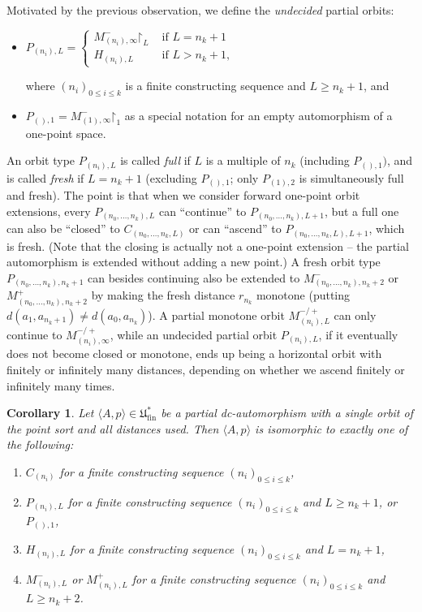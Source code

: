 \documentclass[10pt,a4paper]{article}
\newtheorem{wn}[tw]{Corollary}
\theoremstyle{definition}
\theoremstyle{remark}
\newcommand \seq [1]{\langle #1 \rangle}
\newcommand \restr [1] {\mathord{\upharpoonright}_{#1}}
\newcommand \fin {{\operatorname{fin}}}
\newcommand \Ult {\mathfrak{U}}
\begin{document}
Motivated by the previous observation, we define the \emph{undecided} partial orbits:
\begin{itemize}
    \item 
    $P_{(n_i), L}=
    \begin{cases}
    M^-_{(n_i), \infty}\restr{L} & \text{ if } L = n_k + 1 \\  H_{(n_i), L} & \text{ if } L > n_k + 1,
    \end{cases}$
    
    where $(n_i)_{0 \leq i \leq k}$
    is a finite constructing sequence and $L \geq n_k + 1$, and

    \item $P_{(), 1} = M^-_{(1), \infty}\restr{1}$ as a special notation for an empty automorphism of a one-point space.
\end{itemize}
An orbit type $P_{(n_i), L}$ is called \emph{full} if $L$ is a multiple of $n_k$ (including $P_{(), 1})$, and is called \emph{fresh} if $L = n_k + 1$ (excluding $P_{(), 1}$; only $P_{(1), 2}$ is simultaneously full and fresh).
The point is that when we consider forward one-point orbit extensions, every $P_{(n_0, \ldots, n_k), L}$ can ``continue'' to $P_{(n_0, \ldots, n_k), L + 1}$, but a full one can also be ``closed'' to $C_{(n_0, \ldots, n_k, L)}$ or can ``ascend'' to $P_{(n_0, \ldots, n_k, L), L + 1}$,  which is fresh.
(Note that the closing is actually not a one-point extension – the partial automorphism is extended without adding a new point.)
A fresh orbit type $P_{(n_0, \ldots, n_k), n_k + 1}$ can besides continuing also be extended to $M^-_{(n_0, \ldots, n_k), n_k + 2}$ or $M^+_{(n_0, \ldots, n_k), n_k + 2}$ by making the fresh distance $r_{n_k}$ monotone (putting $d(a_1, a_{n_k + 1}) \neq d(a_0, a_{n_k})$). 
A partial monotone orbit $M^{-/+}_{(n_i), L}$ can only continue  to $M^{-/+}_{(n_i), \infty}$, while an undecided partial orbit $P_{(n_i), L}$, if it eventually does not become closed or monotone, ends up being a horizontal orbit with finitely or infinitely many distances, depending on whether we ascend finitely or infinitely many times.


\begin{wn} \label{thm:partial_single_orbit}
    Let $\seq{A, p} \in \Ult^*_\fin$ be a partial dc-automorphism with a single orbit of the point sort and all distances used.
    Then $\seq{A, p}$ is isomorphic to exactly one of the following:
    \begin{enumerate}
        \item $C_{(n_i)}$ for a finite constructing sequence $(n_i)_{0 \leq i \leq k}$,
        \item $P_{(n_i), L}$ for a finite constructing sequence $(n_i)_{0 \leq i \leq k}$ and $L \geq n_k + 1$, or $P_{(), 1}$,
        \item $H_{(n_i), L}$ for a finite constructing sequence $(n_i)_{0 \leq i \leq k}$ and $L = n_k + 1$,
        \item $M^-_{(n_i), L}$ or $M^+_{(n_i), L}$ for a finite constructing sequence $(n_i)_{0 \leq i \leq k}$ and $L \geq n_k + 2$.
    \end{enumerate}
\end{wn}
\end{document}
